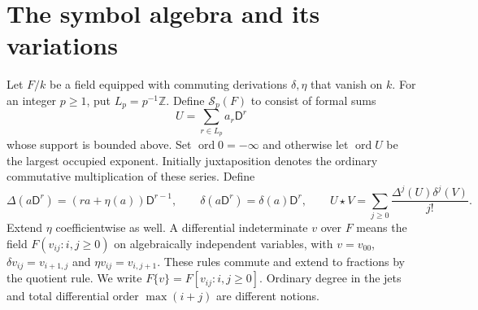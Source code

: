 \documentclass{article}
\newcommand{\DD}{\mathsf D}
\newcommand{\ord}{\operatorname{ord}}
\newcommand{\Sf}{\mathcal S}
\begin{document}
\section{The symbol algebra and its variations}\label{sec:symbol}
Let $F/k$ be a field equipped with commuting derivations $\delta,\eta$ that vanish on $k$. For an integer $p\geq1$, put $L_p=p^{-1}\mathbb Z$. Define $\Sf_p(F)$ to consist of formal sums
\[
 U=\sum_{r\in L_p}a_r\DD^r
\]
whose support is bounded above. Set $\ord0=-\infty$ and otherwise let $\ord U$ be the largest occupied exponent. Initially juxtaposition denotes the ordinary commutative multiplication of these series. Define
\[
 \Delta(a\DD^r)=(ra+\eta(a))\DD^{r-1},\qquad
 \delta(a\DD^r)=\delta(a)\DD^r,
 \qquad
 U\star V=\sum_{j\geq0}\frac{\Delta^j(U)\delta^j(V)}{j!}.
 \tag{3.1}\label{eq:star}
\]
Extend $\eta$ coefficientwise as well. A differential indeterminate $v$ over $F$ means the field $F(v_{ij}:i,j\geq0)$ on algebraically independent variables, with $v=v_{00}$, $\delta v_{ij}=v_{i+1,j}$ and $\eta v_{ij}=v_{i,j+1}$. These rules commute and extend to fractions by the quotient rule. We write $F\{v\}=F[v_{ij}:i,j\geq0]$. Ordinary degree in the jets and total differential order $\max(i+j)$ are different notions.
\end{document}
